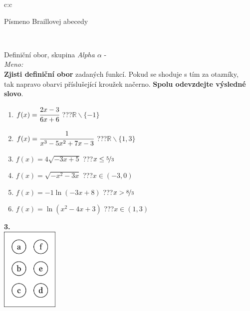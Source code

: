 \documentclass[10pt]{report}
\begin{document}
\begin{tabular}{c:c}
\begin{minipage}[c][99mm][t]{0.49\linewidth}
\begin{center}
\begin{minipage}{0.20\linewidth}
\begin{center}
{\small Písmeno Braillovej abecedy}
\end{center}
\end{minipage}
\end{center}
\end{minipage}
\\ \hdashline
\begin{minipage}[c][99mm][t]{0.49\linewidth}
\begin{center}
\vspace{7mm}
{\huge Definiční obor, skupina \textit{Alpha $\alpha$} -}\\[4.5mm]
\textit{Meno:}\phantom{xxxxxxxxxxxxxxxxxxxxxxxxxxxxxxxxxxxxxxxxxxxxxxxxxxxxxxxxxxxxxxxxx}\\[3.5mm]
\textbf{Zjisti definiční obor} zadaných funkcí. Pokud se shoduje s tím za otazníky,\\tak napravo obarvi příslušející kroužek načerno. \textbf{Spolu odevzdejte výsledné slovo}.\\[3mm]
\begin{minipage}{0.77\linewidth}
\begin{center}
\begin{varwidth}{\textwidth}
\begin{enumerate}
\normalsize
\item $f(x)=\cfrac{2x-3}{6x+6}$\quad \dotfill\; ???\;\dotfill \quad $\mathbb{R}\smallsetminus\{-1\}$
\item $f(x)=\cfrac{1}{x^3-5x^2+7x-3}$\quad \dotfill\; ???\;\dotfill \quad $\mathbb{R}\smallsetminus\{1,3\}$
\item $f(x)=4\sqrt{-3x+5}$\quad \dotfill\; ???\;\dotfill \quad $x\leq\nicefrac{5}{3}$
\item $f(x)=\sqrt{-x^2-3x}$\quad \dotfill\; ???\;\dotfill \quad $x\in(-3 , 0)$
\item $f(x)=-1\ln{(-3x+8)}$\quad \dotfill\; ???\;\dotfill \quad $x>\nicefrac{8}{3}$
\item $f(x)=\ln{(x^2-4x+3)}$\quad \dotfill\; ???\;\dotfill \quad $x\in(1 , 3)$
\end{enumerate}
\end{varwidth}
\end{center}
\end{minipage}
\begin{minipage}{0.20\linewidth}
\begin{center}
{\Huge\bfseries 3.} \\[2mm]
\includegraphics[height=40mm]{../images/braille.png}

\end{center}
\end{minipage}
\end{center}
\end{minipage}
\end{tabular}
\end{document}
